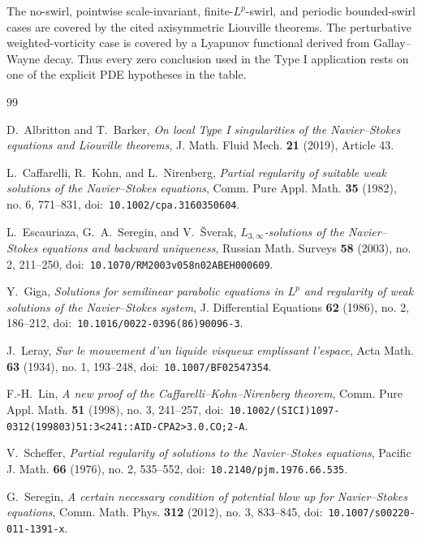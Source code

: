 \documentclass[11pt]{amsart}
\theoremstyle{plain}
\theoremstyle{definition}
\theoremstyle{remark}
\numberwithin{equation}{section}
\begin{document}
The no-swirl, pointwise scale-invariant, finite-\(L^p\)-swirl, and periodic
bounded-swirl cases are covered by the cited axisymmetric Liouville theorems.
The perturbative weighted-vorticity case is covered by a Lyapunov functional
derived from Gallay--Wayne decay.
Thus every zero conclusion used in the Type I application rests on one of the
explicit PDE hypotheses in the table.



\clearpage
\begin{thebibliography}{99}

D.~Albritton and T.~Barker,
\emph{On local Type I singularities of the Navier--Stokes equations and
Liouville theorems},
J. Math. Fluid Mech. \textbf{21} (2019), Article 43.

L.~Caffarelli, R.~Kohn, and L.~Nirenberg,
\emph{Partial regularity of suitable weak solutions of the Navier--Stokes
 equations},
Comm. Pure Appl. Math. \textbf{35} (1982), no. 6, 771--831,
doi:\ \nolinkurl{10.1002/cpa.3160350604}.

L.~Escauriaza, G.~A.~Seregin, and V.~{\v S}verak,
\emph{\(L_{3,\infty}\)-solutions of the Navier--Stokes equations and
 backward uniqueness},
Russian Math. Surveys \textbf{58} (2003), no. 2, 211--250,
doi:\ \nolinkurl{10.1070/RM2003v058n02ABEH000609}.

Y.~Giga,
\emph{Solutions for semilinear parabolic equations in \(L^p\) and regularity
 of weak solutions of the Navier--Stokes system},
J. Differential Equations \textbf{62} (1986), no. 2, 186--212,
doi:\ \nolinkurl{10.1016/0022-0396(86)90096-3}.

J.~Leray,
\emph{Sur le mouvement d'un liquide visqueux emplissant l'espace},
Acta Math. \textbf{63} (1934), no. 1, 193--248,
doi:\ \nolinkurl{10.1007/BF02547354}.

F.-H.~Lin,
\emph{A new proof of the Caffarelli--Kohn--Nirenberg theorem},
Comm. Pure Appl. Math. \textbf{51} (1998), no. 3, 241--257,
doi:\ \nolinkurl{10.1002/(SICI)1097-0312(199803)51:3<241::AID-CPA2>3.0.CO;2-A}.

V.~Scheffer,
\emph{Partial regularity of solutions to the Navier--Stokes equations},
Pacific J. Math. \textbf{66} (1976), no. 2, 535--552,
doi:\ \nolinkurl{10.2140/pjm.1976.66.535}.

G.~Seregin,
\emph{A certain necessary condition of potential blow up for Navier--Stokes
 equations},
Comm. Math. Phys. \textbf{312} (2012), no. 3, 833--845,
doi:\ \nolinkurl{10.1007/s00220-011-1391-x}.


\end{thebibliography}
\end{document}
